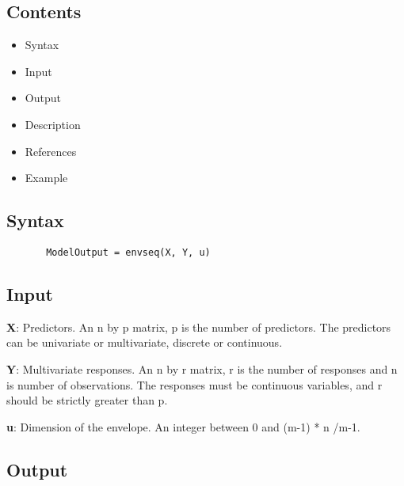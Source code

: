 \documentclass[a4paper,11pt,openany]{memoir}
\begin{document}
\subsection*{Contents}

\begin{itemize}
\setlength{\itemsep}{-1ex}
   \item Syntax
   \item Input
   \item Output
   \item Description
   \item References
   \item Example
\end{itemize}


\subsection*{Syntax}


\begin{verbatim}       ModelOutput = envseq(X, Y, u)\end{verbatim}
    

\subsection*{Input}

\begin{par}
\textbf{X}: Predictors. An n by p matrix, p is the number of predictors. The predictors can be univariate or multivariate, discrete or continuous.
\end{par} \vspace{1em}
\begin{par}
\textbf{Y}: Multivariate responses. An n by r matrix, r is the number of responses and n is number of observations. The responses must be continuous variables, and r should be strictly greater than p.
\end{par} \vspace{1em}
\begin{par}
\textbf{u}: Dimension of the envelope. An integer between 0 and (m-1) * n /m-1.
\end{par} \vspace{1em}


\subsection*{Output}
\end{document}

